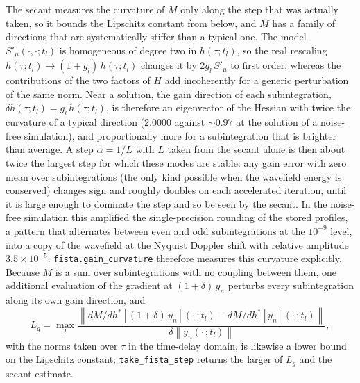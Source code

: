 \documentclass[manuscript]{aastex631}
\begin{document}
The secant measures the curvature of $M$ only along the step that was actually taken, so it bounds
the Lipschitz constant from below, and $M$ has a family of directions that are systematically
stiffer than a typical one. The model $S'_\mu(\cdot,\cdot;t_l)$ is homogeneous of degree two in
$h(\tau;t_l)$, so the real rescaling $h(\tau;t_l)\to(1+g_l)\,h(\tau;t_l)$ changes it by
$2g_l\,S'_\mu$ to first order, whereas the contributions of the two factors of $H$ add incoherently
for a generic perturbation of the same norm. Near a solution, the gain direction of each
subintegration, $\delta h(\tau;t_l)=g_l\,h(\tau;t_l)$, is therefore an eigenvector of the Hessian
with twice the curvature of a typical direction (2.0000 against $\sim0.97$ at the solution of a
noise-free simulation), and proportionally more for a subintegration that is brighter than
average. A step $\alpha=1/L$ with $L$ taken from the secant alone is then about twice the largest
step for which these modes are stable: any gain error with zero mean over subintegrations (the
only kind possible when the wavefield energy is conserved) changes sign and roughly doubles on each
accelerated iteration, until it is large enough to dominate the step and so be seen by the secant.
In the noise-free simulation this amplified the single-precision rounding of the stored profiles,
a pattern that alternates between even and odd subintegrations at the $10^{-9}$ level, into a copy
of the wavefield at the Nyquist Doppler shift with relative amplitude $3.5\times10^{-5}$.
\texttt{fista.gain\_curvature} therefore measures this curvature explicitly. Because $M$ is a sum
over subintegrations with no coupling between them, one additional evaluation of the gradient at
$(1+\delta)\,y_n$ perturbs every subintegration along its own gain direction, and
\begin{equation}
L_g = \max_l \frac{\left\| dM/dh^*[(1+\delta)\,y_n](\cdot\,;t_l) - dM/dh^*[y_n](\cdot\,;t_l) \right\|}
                  {\delta \left\| y_n(\cdot\,;t_l) \right\|},
\label{eqn:gain_curvature}
\end{equation}
with the norms taken over $\tau$ in the time-delay domain, is likewise a lower bound on the
Lipschitz constant; \texttt{take\_fista\_step} returns the larger of $L_g$ and the secant estimate.



\end{document}
